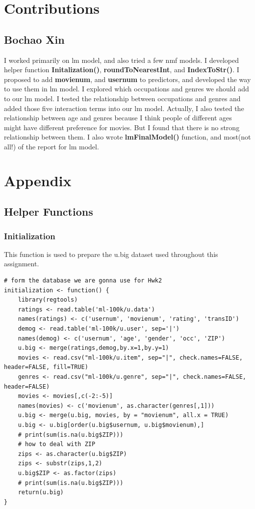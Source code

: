 \documentclass[11pt]{article}
\begin{document}
\section{Contributions}
\subsection{Bochao Xin}
I worked primarily on lm model, and also tried a few nmf models. I 
developed helper function \textbf{Initalization()}, 
\textbf{roundToNearestInt}, and \textbf{IndexToStr()}. I proposed 
to add \textbf{movienum}, and \textbf{usernum} to predictors, and 
developed the way to use them in lm model. I explored which 
occupations and genres we should add to our lm model. I tested the 
relationship between occupations and genres and added those five 
interaction terms into our lm model. Actually, I also tested the 
relationship between age and genres because I think people of 
different ages might have different preference for movies. But I
found that there is no strong relationship between them.
I also wrote \textbf{lmFinalModel()} function, and most(not all!) of the report for lm model.

\section{Appendix}
\subsection{Helper Functions}
\subsubsection{Initialization}
This function is used to prepare the u.big dataset used throughout
this assignment.
\begin{verbatim}
# form the database we are gonna use for Hwk2
initialization <- function() {
	library(regtools)
	ratings <- read.table('ml-100k/u.data')
	names(ratings) <- c('usernum', 'movienum', 'rating', 'transID')
	demog <- read.table('ml-100k/u.user', sep='|')
	names(demog) <- c('usernum', 'age', 'gender', 'occ', 'ZIP')
	u.big <- merge(ratings,demog,by.x=1,by.y=1)
	movies <- read.csv("ml-100k/u.item", sep="|", check.names=FALSE, header=FALSE, fill=TRUE)
	genres <- read.csv("ml-100k/u.genre", sep="|", check.names=FALSE, header=FALSE)
	movies <- movies[,c(-2:-5)]
	names(movies) <- c('movienum', as.character(genres[,1]))
	u.big <- merge(u.big, movies, by = "movienum", all.x = TRUE)
	u.big <- u.big[order(u.big$usernum, u.big$movienum),]
	# print(sum(is.na(u.big$ZIP)))
	# how to deal with ZIP
	zips <- as.character(u.big$ZIP)
	zips <- substr(zips,1,2)
	u.big$ZIP <- as.factor(zips)
	# print(sum(is.na(u.big$ZIP)))
	return(u.big)
}
\end{verbatim}
\end{document}

